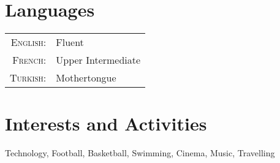 \documentclass[a4paper,10pt]{article} %
\begin{document}

\section{Languages}

\begin{tabular}{r|p{13cm}}
\textsc{English:} & Fluent\\

\textsc{French:} & Upper Intermediate\\

\textsc{Turkish:} & Mothertongue\\
\end{tabular}



\section{Interests and Activities}

Technology, Football, Basketball, Swimming, Cinema, Music, Travelling\\
\end{document}
